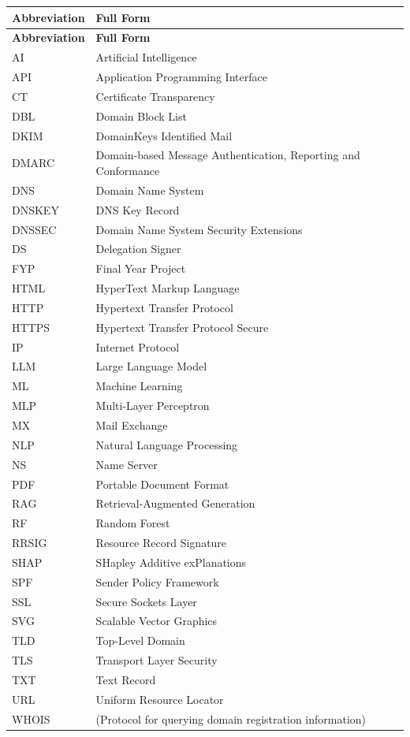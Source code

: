 \documentclass[12pt, a4paper, oneside]{report}
\begin{document}
\begin{longtable}{|p{3cm}|p{10.5cm}|}
\hline
\rowcolor{nfsuBlue!15}
\textbf{Abbreviation} & \textbf{Full Form} \\
\hline
\endfirsthead
\hline
\rowcolor{nfsuBlue!15}
\textbf{Abbreviation} & \textbf{Full Form} \\
\hline
\endhead
\hline
\endfoot
AI      & Artificial Intelligence \\ \hline
API     & Application Programming Interface \\ \hline
CT      & Certificate Transparency \\ \hline
DBL     & Domain Block List \\ \hline
DKIM    & DomainKeys Identified Mail \\ \hline
DMARC   & Domain-based Message Authentication, Reporting and Conformance \\ \hline
DNS     & Domain Name System \\ \hline
DNSKEY  & DNS Key Record \\ \hline
DNSSEC  & Domain Name System Security Extensions \\ \hline
DS      & Delegation Signer \\ \hline
FYP     & Final Year Project \\ \hline
HTML    & HyperText Markup Language \\ \hline
HTTP    & Hypertext Transfer Protocol \\ \hline
HTTPS   & Hypertext Transfer Protocol Secure \\ \hline
IP      & Internet Protocol \\ \hline
LLM     & Large Language Model \\ \hline
ML      & Machine Learning \\ \hline
MLP     & Multi-Layer Perceptron \\ \hline
MX      & Mail Exchange \\ \hline
NLP     & Natural Language Processing \\ \hline
NS      & Name Server \\ \hline
PDF     & Portable Document Format \\ \hline
RAG     & Retrieval-Augmented Generation \\ \hline
RF      & Random Forest \\ \hline
RRSIG   & Resource Record Signature \\ \hline
SHAP    & SHapley Additive exPlanations \\ \hline
SPF     & Sender Policy Framework \\ \hline
SSL     & Secure Sockets Layer \\ \hline
SVG     & Scalable Vector Graphics \\ \hline
TLD     & Top-Level Domain \\ \hline
TLS     & Transport Layer Security \\ \hline
TXT     & Text Record \\ \hline
URL     & Uniform Resource Locator \\ \hline
WHOIS   & (Protocol for querying domain registration information) \\
\end{longtable}
\end{document}
